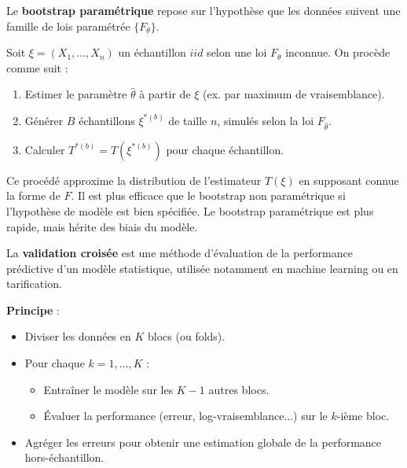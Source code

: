 \begin{f}
	
	Le \textbf{bootstrap paramétrique} repose sur l’hypothèse que les données suivent une famille de lois paramétrée \(\{F_\theta\}\).
	
	Soit \(\xi = (X_1, \ldots, X_n)\) un échantillon \(iid\) selon une loi \(F_\theta\) inconnue. On procède comme suit :
	\begin{enumerate}
		\item Estimer le paramètre \(\hat{\theta}\) à partir de \(\xi\) (ex. par maximum de vraisemblance).
		\item Générer \(B\) échantillons \(\xi^{\ast(b)}\) de taille \(n\), simulés selon la loi \(F_{\hat{\theta}}\).
		\item Calculer \(T^{\ast(b)} = T(\xi^{\ast(b)})\) pour chaque échantillon.
	\end{enumerate}
	
	Ce procédé approxime la distribution de l’estimateur \(T(\xi)\) en supposant connue la forme de \(F\). Il est plus efficace que le bootstrap non paramétrique si l’hypothèse de modèle est bien spécifiée. Le bootstrap paramétrique est plus rapide, mais hérite des biais du modèle.
	
\end{f}

\begin{f}
	
	La \textbf{validation croisée} est une méthode d’évaluation de la performance prédictive d’un modèle statistique, utilisée notamment en machine learning ou en tarification.
	
	\textbf{Principe} :
	\begin{itemize}
		\item Diviser les données en \(K\) blocs (ou folds).
		\item Pour chaque \(k = 1,\ldots,K\) :
		\begin{itemize}
			\item Entraîner le modèle sur les \(K-1\) autres blocs.
			\item Évaluer la performance (erreur, log-vraisemblance...) sur le \(k\)-ième bloc.
		\end{itemize}
		\item Agréger les erreurs pour obtenir une estimation globale de la performance hors-échantillon.
	\end{itemize}
	
\end{f}

